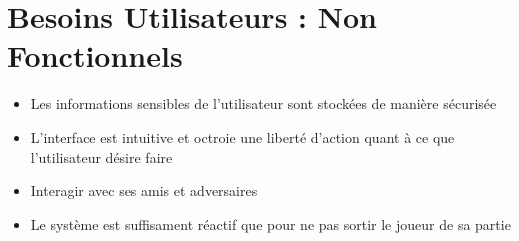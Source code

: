 \section{Besoins Utilisateurs : Non Fonctionnels}
\begin{itemize}
	\item Les informations sensibles de l'utilisateur sont stockées de manière sécurisée
	\item L'interface est intuitive et octroie une liberté d'action quant à ce que l'utilisateur désire faire
	\item Interagir avec ses amis et adversaires
	\item Le système est suffisament réactif que pour ne pas sortir le joueur de sa partie
\end{itemize}
